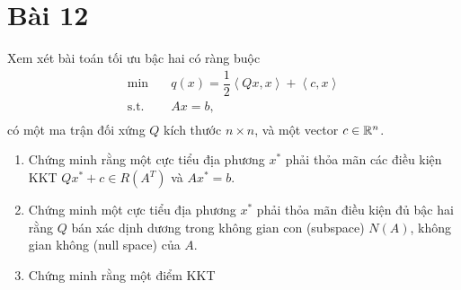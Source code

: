 \section{Bài 12}

Xem xét bài toán tối ưu bậc hai có ràng buộc
\begin{equation}
    \begin{aligned}
        \min \quad & q(x) = \dfrac{1}{2}\left \langle Qx,x \right \rangle + \left \langle c,x \right \rangle\\
        \textrm{s.t.} \quad & Ax = b,\\
    \end{aligned}
\end{equation}
có một ma trận đối xứng $Q$ kích thước $n \times n$, và một vector $c \in \mathbb{R}^n$.
\begin{enumerate}[label=(\alph*)]
    \item Chứng minh rằng một cực tiểu địa phương $x^*$ phải thỏa mãn các điều kiện KKT $Qx^* + c \in R(A^T)$ và $Ax^* = b$.
    \item Chứng minh một cực tiểu địa phương $x^*$ phải thỏa mãn điều kiện đủ bậc hai rằng $Q$ bán xác dịnh dương trong không gian con (subspace) $N(A)$, không gian không (null space) của $A$.
    \item Chứng minh rằng một điểm KKT 
\end{enumerate}

